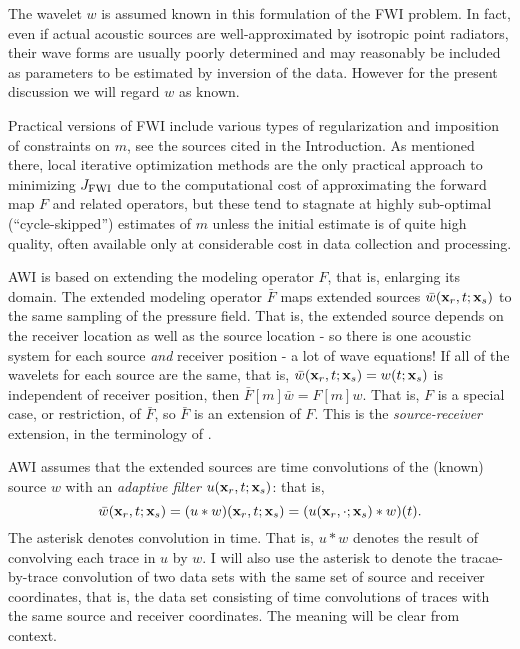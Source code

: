 The wavelet $w$ is assumed known in this formulation of the
FWI problem. In fact, even if actual acoustic sources are
well-approximated by isotropic point radiators, their wave forms are
usually poorly determined and may reasonably be
included as  parameters to be estimated by inversion of the
data. However for the present discussion we will regard $w$ as known.

Practical versions of FWI include various types of regularization and
imposition of constraints on $m$, see the sources cited in the
Introduction. As mentioned there, local iterative optimization methods
are the only practical approach to minimizing $J_{\rm FWI}$ due to the
computational cost of approximating the forward map $F$ and related
operators, but these tend to stagnate at highly sub-optimal
(``cycle-skipped'') estimates of $m$ unless the initial estimate is of
quite high quality, often available only at considerable cost in data
collection and processing.

AWI is based on extending the modeling operator $F$, that is, enlarging its domain.
The extended modeling operator ${\bar F}$ maps extended sources
$\bar{w}({\bf x}_r,t;{\bf x}_s)$ to the same sampling of the pressure
field. That is, the extended source depends on the receiver location
as well as the source location - so there is one acoustic system for
each source {\em and} receiver position - a lot of wave equations! If all
of the wavelets for each source are the same, that is, ${\bar w}({\bf
  x}_r,t;{\bf x}_s) = w(t;{\bf x}_s)$ is independent of receiver
position, then ${\bar F}[m]\bar{w} = F[m]w$. That is, $F$ is a special
case, or restriction, of ${\bar F}$, so ${\bar F}$ is an extension of
$F$. This is the {\em source-receiver} extension, in the terminology of \cite{HuangSymes2015SEG}.

AWI assumes that the extended sources are time convolutions of the
(known) source $w$ with an {\em adaptive filter} $u({\bf
  x}_r,t;{\bf x}_s)$: that is,
\[
  \bar{w}({\bf x}_r,t;{\bf x}_s) = (u * w)({\bf  x}_r,t;{\bf x}_s)
  = (u({\bf  x}_r,\cdot;{\bf x}_s)*w)(t).
\]
The asterisk denotes convolution in time. That is,
$u*w$ denotes the result of convolving each trace in $u$ by $w$. I
will also use the asterisk to denote the tracae-by-trace convolution
of two data sets with the same set of source and receiver coordinates,
that is, the data set consisting of time convolutions of traces with the same source
and receiver coordinates. The meaning will be clear from context.


